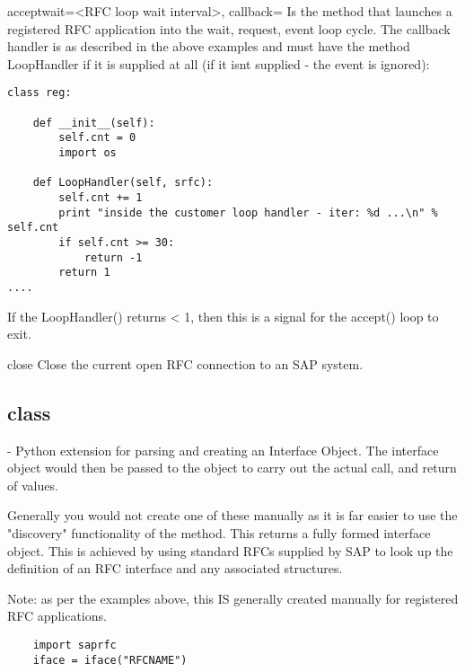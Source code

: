 \documentclass{howto}
\begin{document}
\begin{methoddesc}[conn]{accept}{wait=<RFC loop wait interval>, callback=}
   Is the method that launches a registered RFC application into the wait, request, event loop cycle.
   The callback handler is as described in the above examples and must have the method LoopHandler if it is supplied at all (if it isnt supplied - the event is ignored):

\begin{verbatim}
class reg:

	def __init__(self):
		self.cnt = 0
		import os

	def LoopHandler(self, srfc):
		self.cnt += 1
		print "inside the customer loop handler - iter: %d ...\n" % self.cnt
		if self.cnt >= 30:
			return -1
		return 1
....

\end{verbatim}

   If the LoopHandler() returns < 1, then this is a signal for the accept() loop to exit.

\end{methoddesc}


\begin{methoddesc}[conn]{close}{}
Close the current open RFC connection to an SAP system.
\end{methoddesc}


\subsection{class  \label{classiface}}

 - Python extension for parsing and creating an Interface Object.  The interface object would then be passed to the  object to carry out the actual call, and return of values.

Generally you would not create one of these manually as it is far easier to use the "discovery" functionality of the  method.  This returns a fully formed interface object.  This is achieved by using standard RFCs supplied by SAP to look up the definition of an RFC interface and any associated structures.


Note: as per the examples above, this IS generally created manually for registered RFC applications.

\begin{verbatim}
	import saprfc
	iface = iface("RFCNAME")
\end{verbatim}
\end{document}
